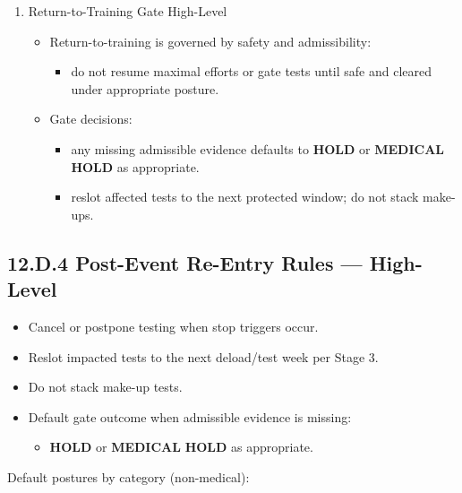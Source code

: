 \documentclass[10pt]{article}
\begin{document}
\begin{enumerate}
\item Return-to-Training Gate High-Level
  \begin{itemize}
  \item Return-to-training is governed by safety and admissibility:
    \begin{itemize}
    \item do not resume maximal efforts or gate tests until safe and cleared under appropriate posture.
    \end{itemize}
  \item Gate decisions:
    \begin{itemize}
    \item any missing admissible evidence defaults to \textbf{HOLD} or \textbf{MEDICAL} \textbf{HOLD} as appropriate.
    \item reslot affected tests to the next protected window; do not stack make-ups.
    \end{itemize}
  \end{itemize}
\end{enumerate}

\newpage

\subsection*{12.D.4 Post-Event Re-Entry Rules — High-Level}
{}

\begin{itemize}
\item Cancel or postpone testing when stop triggers occur.
\item Reslot impacted tests to the next deload/test week per Stage 3.
\item Do not stack make-up tests.
\item Default gate outcome when admissible evidence is missing:
  \begin{itemize}
  \item \textbf{HOLD} or \textbf{MEDICAL} \textbf{HOLD} as appropriate.
  \end{itemize}
\end{itemize}

Default postures by category (non-medical):
\end{document}
